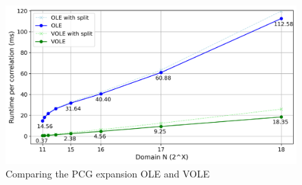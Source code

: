 \begin{figure}[h!]
    \centering
    \includegraphics[scale=0.49]{images/plots/pcg_eval.png}
    \caption{Comparing the PCG expansion OLE and VOLE}
    \label{fig:ComparingPCGExpansion}
\end{figure}

\subsubsection{}
